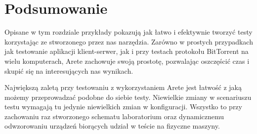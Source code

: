 \documentclass[00-praca-magisterska.tex]{subfiles}
\begin{document}

\section{Podsumowanie}
\label{przyklady-podsumowanie}

Opisane w tym rozdziale przykłady pokazują jak łatwo i efektywnie tworzyć
testy korzystając ze stworzonego przez nas narzędzia. Zarówno w prostych 
przypadkach jak testowanie aplikacji klient-serwer, jak i przy testach 
protokołu BitTorrent na wielu komputerach, Arete zachowuje swoją prostotę, 
pozwalając oszczęścić czas i skupić się na interesujących nas wynikach.

Największą zaletą przy testowaniu z wykorzystaniem Arete jest łatwość z 
jaką możemy przeprowadzać podobne do siebie testy. Niewielkie zmiany w 
scenariuszu testu wymagają tu jedynie niewielkich zmian w konfiguracji. 
Wszystko to przy zachowaniu raz stworzonego schematu laboratorium oraz 
dynamicznemu odwzorowaniu urządzeń biorących udział w teście na fizyczne 
maszyny.
\end{document}
